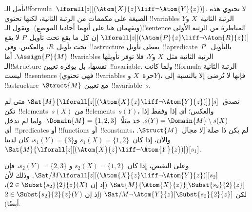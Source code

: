 \documentclass[../../../include/open-logic-section]{subfiles}
\begin{document}
\begin{ex}
  تأمل الـ!!{formula}~$\lforall[z][(\Atom{X}{z} \liff \lnot
    \Atom{Y}{z})]$. لا تحتوي هذه الصيغة على مكممات من الرتبة الثانية،
  لكنها تحتوي !!{variable}s الرتبة الثانية~$X$ و$Y$ (ويفهمان هنا على
  أنهما أحاديا الموضع). وتقول الـ!!{sentence} المناظرة من الرتبة الأولى
  $\lforall[z][(\Atom{P}{z} \liff \lnot \Atom{R}{z})]$ إن كل ما يقع
  تحت تأويل~$P$ لا يقع تحت تأويل~$R$، والعكس. وفي~!!a{structure} يعطى
  تأويل~!!a{predicate}~$P$ بالتأويل~$\Assign{P}{M}$. أما
  !!{variable}s الرتبة الثانية مثل~$X$ و$Y$، فلا توفر تأويلها
  الـ!!{structure} نفسها، بل يوفره تعيين~!!a{variable}. ولما كانت
  !!{formula} الرتبة الثانية ليست~!!a{sentence} (فهي تحتوي
  !!{variable}s حرة~$X$ و$Y$)، فإنها لا تُرضى إلا بالنسبة إلى
  !!a{structure}~$\Struct{M}$ مع تعيين~!!a{variable}~$s$.

  تصدق~$\Sat{M}{\lforall[z][(\Atom{X}{z} \liff \lnot
    \Atom{Y}{z})]}[s]$ متى لم تكن~!!{element}s~$s(X)$ من
  !!{element}s~$s(Y)$، والعكس؛ أي إذا وفقط إذا
  $s(Y) = \Domain{M} \setminus s(X)$. خذ مثلًا
  $\Domain{M} = \{1, 2, 3\}$. ولما لم تدخل أي~!!{predicate}s أو
  !!{function}s أو~!!{constant}s، لم يكن ذا صلة إلا مجال~$\Struct{M}$.
  والآن، إذا كان~$s_1(X) = \{1, 2\}$ و$s_1(Y) = \{3\}$، كان لدينا
  $\Sat{M}{\lforall[z][(\Atom{X}{z}
      \liff \lnot \Atom{Y}{z})]}[s_1]$.

  وعلى النقيض، إذا كان~$s_2(X) = \{1, 2\}$ و
  $s_2(Y) = \{2, 3\}$، فإن
  $\Sat/{M}{\lforall[z][(\Atom{X}{z} \liff \lnot
      \Atom{Y}{z})]}[s_2]$. وذلك لأن
  $\Sat{M}{\Atom{X}{z}}[\Subst{s_2}{2}{z}]$ (إذ إن
  $2 \in \Subst{s_2}{2}{z}(X)$)، لكن
  $\Sat/{M}{\lnot \Atom{Y}{z}}[\Subst{s_2}{2}{z}]$ (إذ إن
  $2 \in \Subst{s_2}{2}{z}(Y)$ أيضًا).
\end{ex}
\end{document}
